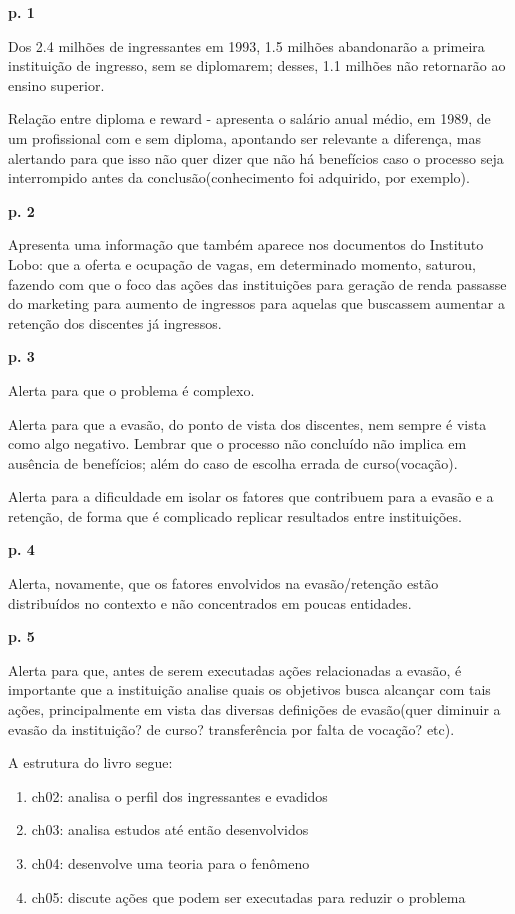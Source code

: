\documentclass{report}
\begin{document}
\textbf{p. 1}

Dos 2.4 milhões de ingressantes em 1993, 1.5 milhões abandonarão a primeira instituição de ingresso, sem se diplomarem; desses, 1.1 milhões não retornarão ao ensino superior.

Relação entre diploma e reward - apresenta o salário anual médio, em 1989, de um profissional com e sem diploma, apontando ser relevante a diferença, mas alertando para que isso não quer dizer que não há benefícios caso o processo seja interrompido antes da conclusão(conhecimento foi adquirido, por exemplo).

\textbf{p. 2}

Apresenta uma informação que também aparece nos documentos do Instituto Lobo: que a oferta e ocupação de vagas, em determinado momento, saturou, fazendo com que o foco das ações das instituições para geração de renda passasse do marketing para aumento de ingressos para aquelas que buscassem aumentar a retenção dos discentes já ingressos.

\textbf{p. 3}

Alerta para que o problema é complexo.

Alerta para que a evasão, do ponto de vista dos discentes, nem sempre é vista como algo negativo. Lembrar que o processo não concluído não implica em ausência de benefícios; além do caso de escolha errada de curso(vocação).

Alerta para a dificuldade em isolar os fatores que contribuem para a evasão e a retenção, de forma que é complicado replicar resultados entre instituições.

\textbf{p. 4}

Alerta, novamente, que os fatores envolvidos na evasão/retenção estão distribuídos no contexto e não concentrados em poucas entidades.

\textbf{p. 5}

Alerta para que, antes de serem executadas ações relacionadas a evasão, é importante que a instituição analise quais os objetivos busca alcançar com tais ações, principalmente em vista das diversas definições de evasão(quer diminuir a evasão da instituição? de curso? transferência por falta de vocação? etc).

A estrutura do livro segue:

\begin{enumerate}

\item ch02: analisa o perfil dos ingressantes e evadidos

\item ch03: analisa estudos até então desenvolvidos
 
\item ch04: desenvolve uma teoria para o fenômeno

\item ch05: discute ações que podem ser executadas para reduzir o problema

\end{enumerate}
\end{document}
